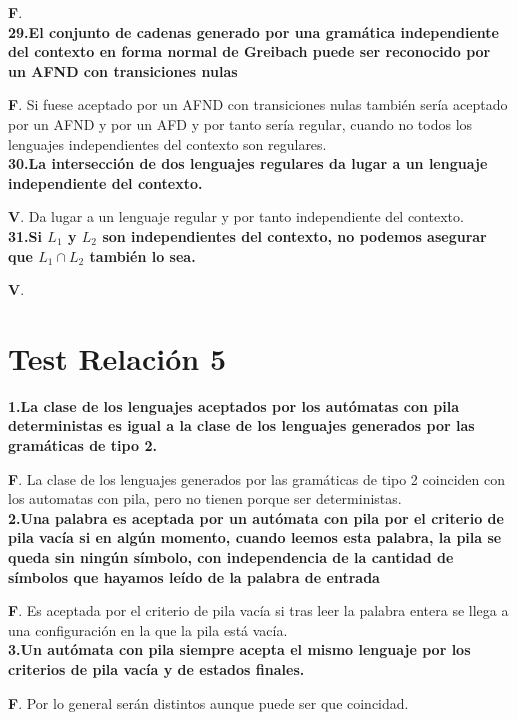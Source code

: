 \documentclass[a4paper,11pt]{article}
\begin{document}
\textbf{F}. \\

\textbf{29.El conjunto de cadenas generado por una gramática independiente del contexto en forma normal de Greibach puede ser reconocido por un AFND con transiciones nulas}

\textbf{F}. Si fuese aceptado por un AFND con transiciones nulas también sería aceptado por un AFND y por un AFD y por tanto sería regular, cuando no todos los lenguajes independientes del contexto son regulares. \\

\textbf{30.La intersección de dos lenguajes regulares da lugar a un lenguaje independiente del contexto.}

\textbf{V}. Da lugar a un lenguaje regular y por tanto independiente del contexto. \\

\textbf{31.Si $L_1$ y $L_2$ son independientes del contexto, no podemos asegurar que $L_1 \cap L_2$ también lo sea.}

\textbf{V}. \\

\section{Test Relación 5}

\textbf{1.La clase de los lenguajes aceptados por los autómatas con pila deterministas es igual a la clase de los lenguajes generados por las gramáticas de tipo 2.}

\textbf{F}. La clase de los lenguajes generados por las gramáticas de tipo 2 coinciden con los automatas con pila, pero no tienen porque ser deterministas. \\

\textbf{2.Una palabra es aceptada por un autómata con pila por el criterio de pila vacía si en algún momento, cuando leemos esta palabra, la pila se queda sin ningún símbolo, con independencia de la cantidad de símbolos que hayamos leído de la palabra de entrada}

\textbf{F}. Es aceptada por el criterio de pila vacía si tras leer la palabra entera se llega a una configuración en la que la pila está vacía. \\

\textbf{3.Un autómata con pila siempre acepta el mismo lenguaje por los criterios de pila vacía y de estados finales.}

\textbf{F}. Por lo general serán distintos aunque puede ser que coincidad. \\
\end{document}
